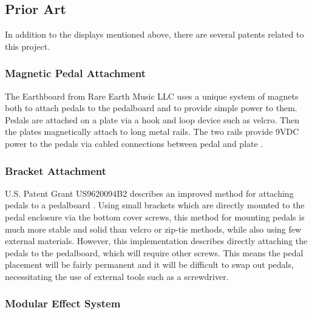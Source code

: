 \documentclass{article}
\begin{document}
	\subsection{Prior Art}
	\color{gray}

	In addition to the displays mentioned above, there are several patents related to this project.

		\subsubsection{Magnetic Pedal Attachment}
		The Earthboard from Rare Earth Music LLC uses a unique system of magnets both to attach pedals to the pedalboard and to provide simple power to them.  Pedals are attached on a plate via a hook and loop device such as velcro.  Then the plates magnetically attach to long metal rails.  The two rails provide 9VDC power to the pedals via cabled connections between pedal and plate \cite{EARTHBOARDSITE}.

		\subsubsection{Bracket Attachment}

		U.S. Patent Grant US9620094B2 describes an improved method for attaching pedals to a pedalboard \cite{ABBATE:2016}.  Using small brackets which are directly mounted to the pedal enclosure via the bottom cover screws, this method for mounting pedals is much more stable and solid than velcro or zip-tie methods, while also using few external materials. However, this implementation describes directly attaching the pedals to the pedalboard, which will require other screws. This means the pedal placement will be fairly permanent and it will be difficult to swap out pedals, necessitating the use of external tools such as a screwdriver.

		\subsubsection{Modular Effect System}
\end{document}
